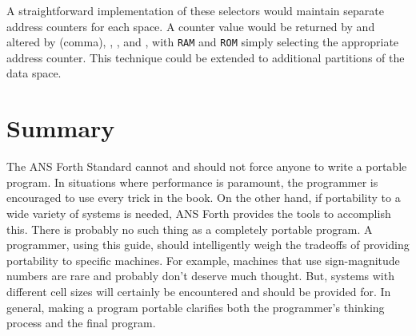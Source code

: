 A straightforward implementation of these selectors would maintain
separate address counters for each space. A counter value would be
returned by  and altered by \word{,} (comma), ,
, and , with \texttt{RAM} and \texttt{ROM}
simply selecting the appropriate address counter. This technique
could be extended to additional partitions of the data space.


\section{Summary} %

The ANS Forth Standard cannot and should not force anyone to write
a portable program. In situations where performance is paramount,
the programmer is encouraged to use every trick in the book. On the
other hand, if portability to a wide variety of systems is needed,
ANS Forth provides the tools to accomplish this. There is probably
no such thing as a completely portable program. A programmer, using
this guide, should intelligently weigh the tradeoffs of providing
portability to specific machines. For example, machines that use
sign-magnitude numbers are rare and probably don't deserve much
thought. But, systems with different cell sizes will certainly be
encountered and should be provided for. In general, making a program
portable clarifies both the programmer's thinking process and the
final program.
